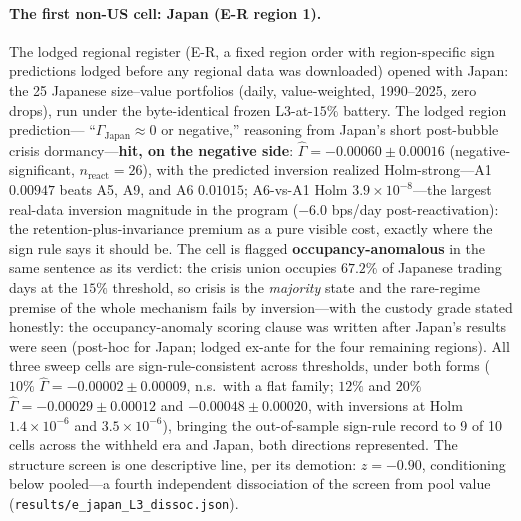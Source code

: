 \documentclass{article}
\begin{document}
\paragraph{The first non-US cell: Japan (E-R region 1).} The lodged
regional register (E-R, a fixed region order with region-specific
sign predictions lodged before any regional data was downloaded)
opened with Japan: the 25 Japanese size--value portfolios (daily,
value-weighted, 1990--2025, zero drops), run under the byte-identical
frozen L3-at-$15\%$ battery. The lodged region prediction---%
``$\Gamma_{\mathrm{Japan}} \approx 0$ or negative,'' reasoning from
Japan's short post-bubble crisis dormancy---\textbf{hit, on the
negative side}: $\hat\Gamma = -0.00060 \pm 0.00016$
(negative-significant, $n_{\mathrm{react}}{=}26$), with the predicted
inversion realized Holm-strong---A1 $0.00947$ beats A5, A9, and A6
$0.01015$; A6-vs-A1 Holm $3.9\times10^{-8}$---the largest real-data
inversion magnitude in the program ($-6.0$ bps/day post-reactivation):
the retention-plus-invariance premium as a pure visible cost, exactly
where the sign rule says it should be. The cell is flagged
\textbf{occupancy-anomalous} in the same sentence as its verdict:
the crisis union occupies $67.2\%$ of Japanese trading days at the
$15\%$ threshold, so crisis is the \emph{majority} state and the
rare-regime premise of the whole mechanism fails by inversion---with
the custody grade stated honestly: the occupancy-anomaly scoring
clause was written after Japan's results were seen (post-hoc for
Japan; lodged ex-ante for the four remaining regions). All three
sweep cells are sign-rule-consistent across thresholds, under both
forms ($10\%$
$\hat\Gamma = -0.00002 \pm 0.00009$, n.s.\ with a flat family;
$12\%$ and $20\%$ $\hat\Gamma = -0.00029 \pm 0.00012$ and
$-0.00048 \pm 0.00020$, with
inversions at Holm $1.4\times10^{-6}$ and $3.5\times10^{-6}$),
bringing the out-of-sample sign-rule record to 9 of 10 cells across
the withheld era and Japan, both directions represented. The
structure screen is one descriptive line, per its demotion:
$z = -0.90$, conditioning below pooled---a fourth independent
dissociation of the screen from pool value
(\texttt{results/e\_japan\_L3\_dissoc.json}).
\end{document}
